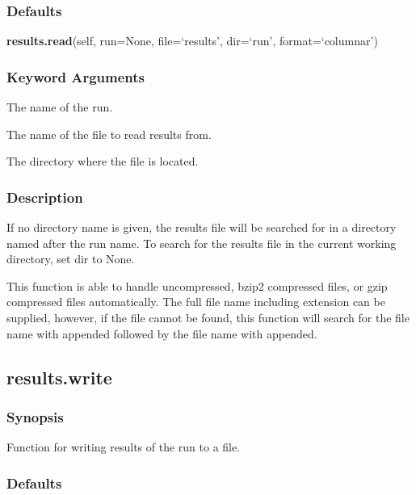 \subsubsection{Defaults}

\textsf{\textbf{results.read}(self, run=None, file=`results', dir=`run', format=`columnar')}


\subsubsection{Keyword Arguments}


  The name of the run.

  The name of the file to read  results from.

  The directory where the file is located.

\subsubsection{Description}

If no directory name is given, the results file will be searched for in a directory named
after the run name.  To search for the results file in the current working directory, set
dir to None.

This function is able to handle uncompressed,  bzip2  compressed files, or gzip  compressed
files automatically.  The full file name including extension can be supplied, however, if
the file cannot be found, this function will search for the file name with 
 appended
followed by the file name with 
 appended.


\newpage

\subsection{results.write}


\subsubsection{Synopsis}

Function for writing results of the run to a file.

\subsubsection{Defaults}

